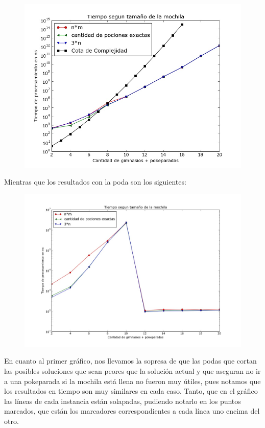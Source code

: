   \begin{figure}[H]
      \begin{center}
        \includegraphics[width=0.7\columnwidth]{imagenes/exp1_ej1_nuevo.jpeg}
        \caption{}
      \end{center}
  \end{figure}

      Mientras que los resultados con la poda son los siguientes:

  \begin{figure}[H]
      \begin{center}
        \includegraphics[width=0.7\columnwidth]{imagenes/exp1_2_ej1_nuevo.jpeg}
        \caption{}
      \end{center}
  \end{figure}

      En cuanto al primer gráfico, nos llevamos la sopresa de que las podas que cortan las posibles soluciones que sean peores que la solución actual y que aseguran no ir a una pokeparada si la mochila está llena no fueron muy útiles, pues notamos que los resultados en tiempo son muy similares en cada caso. Tanto, que en el gráfico las líneas de cada instancia están solapadas, pudiendo notarlo en los puntos marcados, que están los marcadores correspondientes a cada línea uno encima del otro.


